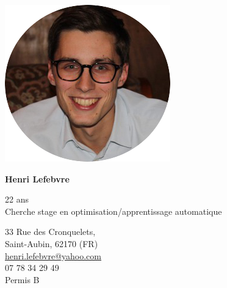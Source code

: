 \documentclass[12pt]{article}
\newlength\cvPhotoWidth
\newlength\cvHspacePhotoTitle
\newlength\cvNameWidth
\newlength\cvAddressWidth
\begin{document}
    \begin{minipage}[t]{\textwidth}
        \begin{minipage}{\cvPhotoWidth}
            \includegraphics[width=\textwidth]{src/profile.png}
        \end{minipage}
        \hspace{\cvHspacePhotoTitle}
            \begin{minipage}[t]{\textwidth-\cvPhotoWidth-\cvHspacePhotoTitle}
            \begin{minipage}{\cvNameWidth}
            \begin{Huge}
                \textbf{Henri Lefebvre}
            \end{Huge}
            22 ans\\
            Cherche stage en optimisation/apprentissage automatique
            \end{minipage}
            \begin{minipage}{\cvAddressWidth}
                \begin{flushright}
                    33 Rue des Cronquelets, \\
                    Saint-Aubin, 62170 (FR)\\
                    \underline{henri.lefebvre@yahoo.com}\\
                    07 78 34 29 49\\
                    Permis B
                \end{flushright}
            \end{minipage}
        \end{minipage}
    \end{minipage}
\end{document}
